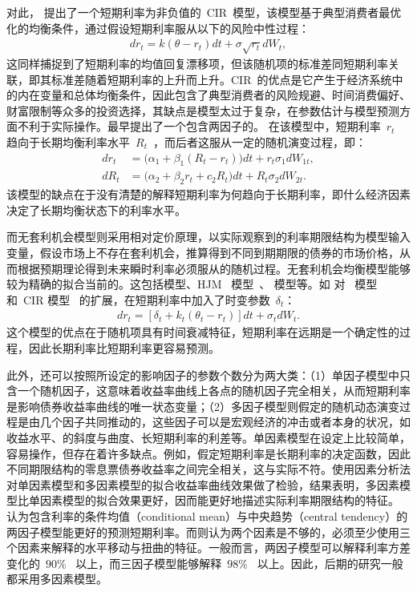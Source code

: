对此， 提出了一个短期利率为非负值的~CIR~模型，该模型基于典型消费者最优化的均衡条件，通过假设短期利率服从以下的风险中性过程：
\begin{align}
  dr_t = k(\theta-r_t)dt + \sigma \sqrt{r_t} d W_t,
\end{align}
这同样捕捉到了短期利率的均值回复漂移项，但该随机项的标准差同短期利率关联，即其标准差随着短期利率的上升而上升。CIR~\tsm 的优点是它产生于经济系统中的内在变量和总体均衡条件，因此包含了典型消费者的风险规避、时间消费偏好、财富限制等众多的投资选择，其缺点是模型太过于复杂，在参数估计与模型预测方面不利于实际操作。最早提出了一个包含两因子的\tsm{}。 在该模型中，短期利率~$r_t$~ 趋向于长期均衡利率水平~$R_t$~，而后者这服从一定的随机演变过程，即：
\begin{align*}
  dr_t &= \big(\alpha_1+\beta_1(R_t-r_t)\big)dt + r_t \sigma_1 d W_{1t}, \\
  dR_t &= \big(\alpha_2+\beta_2r_t+c_2 R_t\big)dt + R_t \sigma_2 d W_{2t}.
\end{align*}
该模型的缺点在于没有清楚的解释短期利率为何趋向于长期利率，即什么经济因素决定了长期均衡状态下的利率水平。

而无套利机会模型则采用相对定价原理，以实际观察到的利率期限结构为模型输入变量，假设市场上不存在套利机会，推算得到不同到期期限的债券的市场价格，从而根据预期理论得到未来瞬时利率必须服从的随机过程。无套利机会均衡模型能够较为精确的拟合当前的\ts{}。这包括模型、HJM~ 模型~\cite{heath1992bond}、 模型等。如 对\citeauthor{vasicek1977equilibrium}~ 模型和~CIR 模型~\cite{cox1985theory} 的扩展，在短期利率中加入了时变参数~$\delta_t$：
\begin{align}
  dr_t = [\delta_t + k_t(\theta_t - r_t)] dt + \sigma_t d W_t.
\end{align}
这个模型的优点在于随机项具有时间衰减特征，短期利率在远期是一个确定性的过程，因此长期利率比短期利率更容易预测。

此外，\tsm 还可以按照所设定的影响因子的参数个数分为两大类：（1）单因子模型中只含一个随机因子，这意味着收益率曲线上各点的随机因子完全相关，从而短期利率是影响债券收益率曲线的唯一状态变量；（2）多因子模型则假定\ts 的随机动态演变过程是由几个因子共同推动的，这些因子可以是宏观经济的冲击或者\yc 本身的状况，如收益水平、\yc 的斜度与曲度、长短期利率的利差等。单因素模型在设定上比较简单，容易操作，但存在着许多缺点。例如，假定短期利率是长期利率的决定函数，因此不同期限结构的零息票债券收益率之间完全相关，这与实际不符。使用因素分析法对单因素模型和多因素模型的拟合收益率曲线效果做了检验，结果表明，多因素模型比单因素模型的拟合效果更好，因而能更好地描述实际利率期限结构的特征。 认为包含利率的条件均值（conditional mean）与中央趋势（central tendency）的两因子模型能更好的预测短期利率。而则认为两个因素是不够的，必须至少使用三个因素来解释\ts 的水平移动与扭曲的特征。一般而言，两因子模型可以解释利率方差变化的~$90\%$~ 以上，而三因子模型能够解释~$98\%$~ 以上。因此，后期的研究一般都采用多因素模型。


